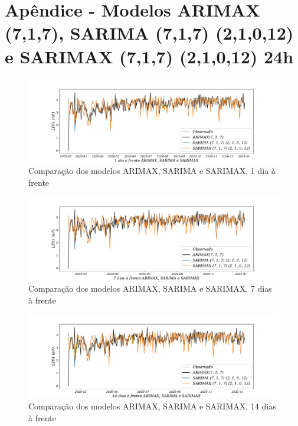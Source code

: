 
\section{Ap\^endice - Modelos ARIMAX (7,1,7), SARIMA (7,1,7) (2,1,0,12) e SARIMAX (7,1,7) (2,1,0,12) 24h}\label{sec:arimaxsarimasarimax24}

\begin{figure}[H]
	\centering
	\caption{Comparação dos modelos ARIMAX, SARIMA e SARIMAX, 1 dia à frente }
	\label{fig:1-ARIMAX-SARIMA-SARIMAX24}
	\includegraphics[width=1\linewidth]{Apendices/Figuras/modelagem-24h/1-ARIMAX-SARIMA-SARIMAX}
	
\end{figure}

\begin{figure}[!htb]
	\centering
	\caption{Comparação dos modelos ARIMAX, SARIMA e SARIMAX, 7 dias à frente }
	\label{fig:10-ARIMAX-SARIMA-SARIMAX24}
	\includegraphics[width=1\linewidth]{Apendices/Figuras/modelagem-24h/7-ARIMAX-SARIMA-SARIMAX}
	
\end{figure}


\begin{figure}[H]
	\centering
	\caption{Comparação dos modelos ARIMAX, SARIMA e SARIMAX, 14 dias à frente }
	\label{fig:30-ARIMAX-SARIMA-SARIMAX24}
	\includegraphics[width=1\linewidth]{Apendices/Figuras/modelagem-24h/14-ARIMAX-SARIMA-SARIMAX}
	
\end{figure}

